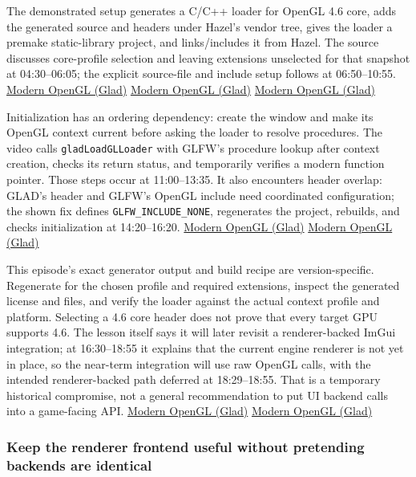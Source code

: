 The demonstrated setup generates a C/C++ loader for OpenGL 4.6 core, adds the generated source and headers under Hazel's vendor tree, gives the loader a premake static-library project, and links/includes it from Hazel. The source discusses core-profile selection and leaving extensions unselected for that snapshot at 04:30--06:05; the explicit source-file and include setup follows at 06:50--10:55. \href{https://www.youtube.com/watch?v=HFyHIc89z1g&t=270s}{Modern OpenGL (Glad)} \href{https://www.youtube.com/watch?v=HFyHIc89z1g&t=410s}{Modern OpenGL (Glad)} \href{https://www.youtube.com/watch?v=HFyHIc89z1g&t=650s}{Modern OpenGL (Glad)}

Initialization has an ordering dependency: create the window and make its OpenGL context current before asking the loader to resolve procedures. The video calls \texttt{gladLoadGLLoader} with GLFW's procedure lookup after context creation, checks its return status, and temporarily verifies a modern function pointer. Those steps occur at 11:00--13:35. It also encounters header overlap: GLAD's header and GLFW's OpenGL include need coordinated configuration; the shown fix defines \texttt{GLFW\_INCLUDE\_NONE}, regenerates the project, rebuilds, and checks initialization at 14:20--16:20. \href{https://www.youtube.com/watch?v=HFyHIc89z1g&t=660s}{Modern OpenGL (Glad)} \href{https://www.youtube.com/watch?v=HFyHIc89z1g&t=860s}{Modern OpenGL (Glad)}

This episode's exact generator output and build recipe are version-specific. Regenerate for the chosen profile and required extensions, inspect the generated license and files, and verify the loader against the actual context profile and platform. Selecting a 4.6 core header does not prove that every target GPU supports 4.6. The lesson itself says it will later revisit a renderer-backed ImGui integration; at 16:30--18:55 it explains that the current engine renderer is not yet in place, so the near-term integration will use raw OpenGL calls, with the intended renderer-backed path deferred at 18:29--18:55. That is a temporary historical compromise, not a general recommendation to put UI backend calls into a game-facing API. \href{https://www.youtube.com/watch?v=HFyHIc89z1g&t=990s}{Modern OpenGL (Glad)} \href{https://www.youtube.com/watch?v=HFyHIc89z1g&t=1109s}{Modern OpenGL (Glad)}

\subsubsection{Keep the renderer frontend useful without pretending backends are identical}\label{keep-the-renderer-frontend-useful-without-pretending-backends-are-identical}

